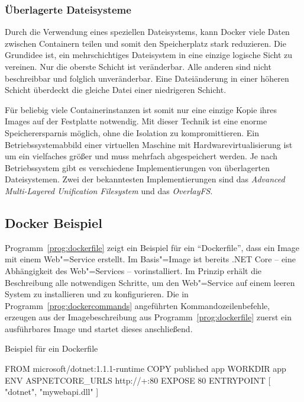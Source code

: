 \subsubsection{Überlagerte Dateisysteme}

Durch die Verwendung eines speziellen Dateisystems, kann Docker viele Daten zwischen Containern teilen und somit den Speicherplatz stark reduzieren. Die Grundidee ist, ein mehrschichtiges Dateisystem in eine einzige logische Sicht zu vereinen. Nur die oberste Schicht ist veränderbar. Alle anderen sind nicht beschreibbar und folglich unveränderbar. Eine Dateiänderung in einer höheren Schicht überdeckt die gleiche Datei einer niedrigeren Schicht.

Für beliebig viele Containerinstanzen ist somit nur eine einzige Kopie ihres Images auf der Festplatte notwendig. Mit dieser Technik ist eine enorme Speicherersparnis möglich, ohne die Isolation zu kompromittieren. Ein Betriebssystemabbild einer virtuellen Maschine mit Hardwarevirtualisierung ist um ein vielfaches größer und muss mehrfach abgespeichert werden. Je nach Betriebssystem gibt es verschiedene Implementierungen von überlagerten Dateisystemen. Zwei der bekanntesten Implementierungen sind das \textit{Advanced Multi-Layered Unification File\-system} und das \textit{OverlayFS}.

\subsection{Docker Beispiel}

Programm~\ref{prog:dockerfile} zeigt ein Beispiel für ein "`Dockerfile"', dass ein Image mit einem Web"=Service erstellt. Im Basis"=Image ist bereits .NET Core -- eine Abhängigkeit des Web"=Services -- vorinstalliert. Im Prinzip erhält die Beschreibung alle notwendigen Schritte, um den Web"=Service auf einem leeren System zu installieren und zu konfigurieren. Die in Programm~\ref{prog:dockercommands} angeführten Kommandozeilenbefehle, erzeugen aus der Imagebeschreibung aus Programm~\ref{prog:dockerfile} zuerst ein ausführbares Image und startet dieses anschließend.


\begin{program}[!hbt]
\caption{Beispiel für ein Dockerfile}
\label{prog:dockerfile}
\begin{DockerCode}
FROM microsoft/dotnet:1.1.1-runtime
COPY published app
WORKDIR app
ENV ASPNETCORE_URLS http://+:80 
EXPOSE 80
ENTRYPOINT [ "dotnet", "mywebapi.dll" ]
\end{DockerCode}
\end{program}

